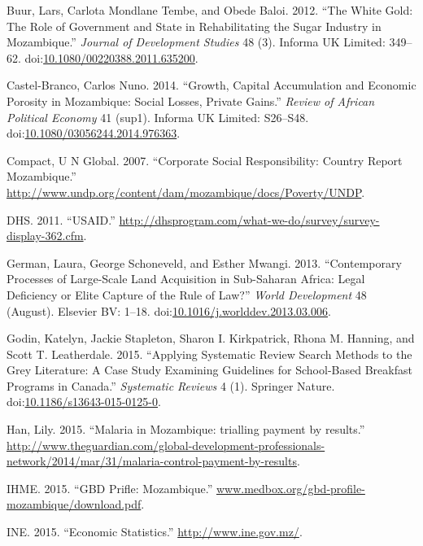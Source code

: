 \documentclass[]{elsarticle} %
\begin{document}
\hypertarget{ref-Buur2012}{}
Buur, Lars, Carlota Mondlane Tembe, and Obede Baloi. 2012. ``The White
Gold: The Role of Government and State in Rehabilitating the Sugar
Industry in Mozambique.'' \emph{Journal of Development Studies} 48 (3).
Informa UK Limited: 349--62.
doi:\href{https://doi.org/10.1080/00220388.2011.635200}{10.1080/00220388.2011.635200}.

\hypertarget{ref-CastelBranco2014}{}
Castel-Branco, Carlos Nuno. 2014. ``Growth, Capital Accumulation and
Economic Porosity in Mozambique: Social Losses, Private Gains.''
\emph{Review of African Political Economy} 41 (sup1). Informa UK
Limited: S26--S48.
doi:\href{https://doi.org/10.1080/03056244.2014.976363}{10.1080/03056244.2014.976363}.

\hypertarget{ref-Compact2007}{}
Compact, U N Global. 2007. ``Corporate Social Responsibility: Country
Report Mozambique.''
\url{http://www.undp.org/content/dam/mozambique/docs/Poverty/UNDP}.

\hypertarget{ref-dhs}{}
DHS. 2011. ``USAID.''
\url{http://dhsprogram.com/what-we-do/survey/survey-display-362.cfm}.

\hypertarget{ref-German2013}{}
German, Laura, George Schoneveld, and Esther Mwangi. 2013.
``Contemporary Processes of Large-Scale Land Acquisition in Sub-Saharan
Africa: Legal Deficiency or Elite Capture of the Rule of Law?''
\emph{World Development} 48 (August). Elsevier BV: 1--18.
doi:\href{https://doi.org/10.1016/j.worlddev.2013.03.006}{10.1016/j.worlddev.2013.03.006}.

\hypertarget{ref-Godin2015}{}
Godin, Katelyn, Jackie Stapleton, Sharon I. Kirkpatrick, Rhona M.
Hanning, and Scott T. Leatherdale. 2015. ``Applying Systematic Review
Search Methods to the Grey Literature: A Case Study Examining Guidelines
for School-Based Breakfast Programs in Canada.'' \emph{Systematic
Reviews} 4 (1). Springer Nature.
doi:\href{https://doi.org/10.1186/s13643-015-0125-0}{10.1186/s13643-015-0125-0}.

\hypertarget{ref-Han}{}
Han, Lily. 2015. ``Malaria in Mozambique: trialling payment by
results.''
\url{http://www.theguardian.com/global-development-professionals-network/2014/mar/31/malaria-control-payment-by-results}.

\hypertarget{ref-ihme}{}
IHME. 2015. ``GBD Prifle: Mozambique.''
\url{www.medbox.org/gbd-profile-mozambique/download.pdf}.

\hypertarget{ref-estatistica}{}
INE. 2015. ``Economic Statistics.'' \url{http://www.ine.gov.mz/}.
\end{document}

